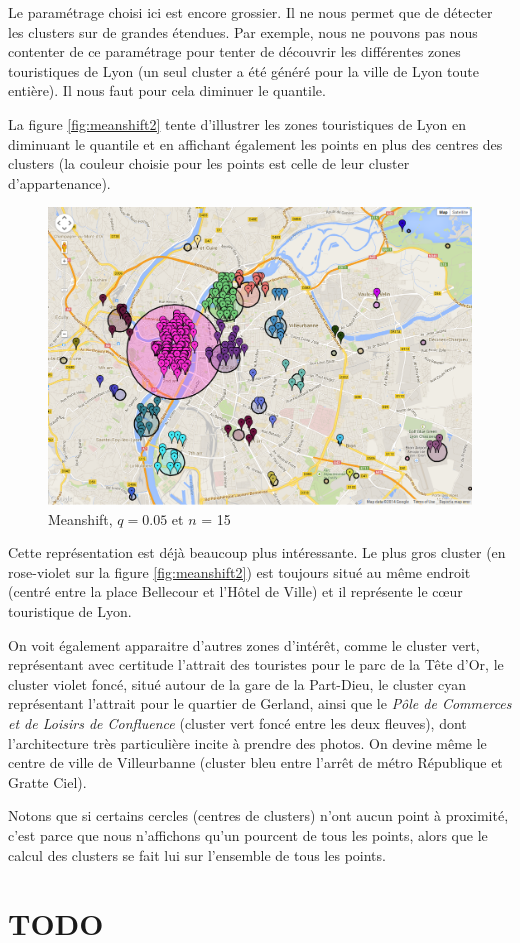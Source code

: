 Le paramétrage choisi ici est encore grossier. Il ne nous permet que de détecter les clusters sur de grandes étendues. Par exemple, nous ne pouvons pas nous contenter de ce paramétrage pour tenter de découvrir les différentes zones touristiques de Lyon (un seul cluster a été généré pour la ville de Lyon toute entière). Il nous faut pour cela diminuer le quantile.

La figure \vref{fig:meanshift2} tente d'illustrer les zones touristiques de Lyon en diminuant le quantile et en affichant également les points en plus des centres des clusters (la couleur choisie pour les points est celle de leur cluster d'appartenance).

\begin{figure}[!h]
    \centering
    \includegraphics[width=16cm]{images/meanshift2.png}
    \caption{Meanshift, $q = 0.05$ et $n$ = 15}
    \label{fig:meanshift2}
\end{figure}

Cette représentation est déjà beaucoup plus intéressante. Le plus gros cluster (en rose-violet sur la figure \vref{fig:meanshift2}) est toujours situé au même endroit (centré entre la place Bellecour et l'Hôtel de Ville) et il représente le cœur touristique de Lyon.

On voit également apparaitre d'autres zones d'intérêt, comme le cluster vert, représentant avec certitude l'attrait des touristes pour le parc de la Tête d'Or, le cluster violet foncé, situé autour de la gare de la Part-Dieu, le cluster cyan représentant l'attrait pour le quartier de Gerland, ainsi que le \textit{Pôle de Commerces et de Loisirs de Confluence} (cluster vert foncé entre les deux fleuves), dont l'architecture très particulière incite à prendre des photos. On devine même le centre de ville de Villeurbanne (cluster bleu entre l'arrêt de métro République et Gratte Ciel).

Notons que si certains cercles (centres de clusters) n'ont aucun point à proximité, c'est parce que nous n'affichons qu'un pourcent de tous les points, alors que le calcul des clusters se fait lui sur l'ensemble de tous les points.

\section{TODO}
